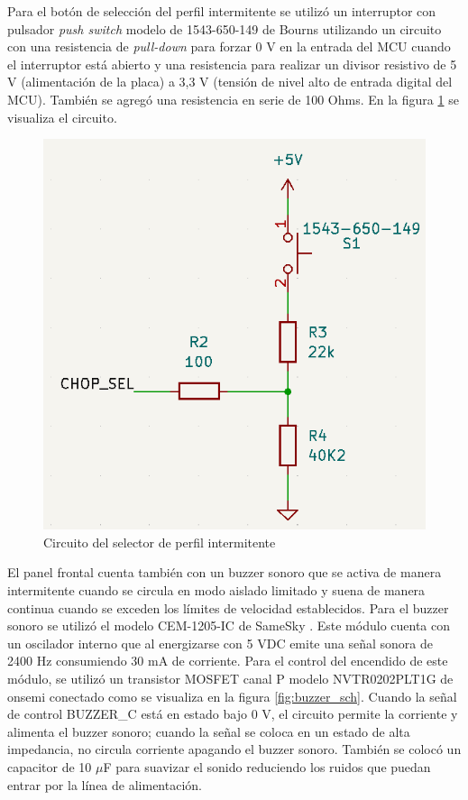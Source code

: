 Para el botón de selección del perfil intermitente se utilizó un interruptor con pulsador \textit{push switch} modelo de 1543-650-149 de Bourns \cite{1543-650-149} utilizando un circuito con una resistencia de \textit{pull-down} para forzar 0 V en la entrada del MCU cuando el interruptor está abierto y una resistencia para realizar un divisor resistivo de 5 V (alimentación de la placa) a 3,3 V (tensión de nivel alto de entrada digital del MCU). También se agregó una resistencia en serie de 100 Ohms. En la figura \ref{fig:chop_sel} se visualiza el circuito. 

\begin{figure}[H]
    \centering
    \includegraphics[width = 0.5 \linewidth]{img/chop_sel.png}
    \caption{Circuito del selector de perfil intermitente}
    \label{fig:chop_sel}
\end{figure}    


El panel frontal cuenta también con un buzzer sonoro que se activa de manera intermitente cuando se circula en modo aislado limitado y suena de manera continua cuando se exceden los límites de velocidad establecidos. Para el buzzer sonoro se utilizó el modelo CEM-1205-IC de SameSky \cite{CEM-1205-IC}. Este módulo cuenta con un oscilador interno que al energizarse con 5 VDC emite una señal sonora de 2400 Hz consumiendo 30 mA de corriente. Para el control del encendido de este módulo, se utilizó un transistor MOSFET canal P modelo NVTR0202PLT1G de onsemi \cite{NVTR0202PLT1G} conectado como se visualiza en la figura \ref{fig:buzzer_sch}. Cuando la señal de control BUZZER\_C está en estado bajo 0 V, el circuito permite la corriente y alimenta el buzzer sonoro; cuando la señal se coloca en un estado de alta impedancia, no circula corriente apagando el buzzer sonoro. También se colocó un capacitor de 10 $\mu$F para suavizar el sonido reduciendo los ruidos que puedan entrar por la línea de alimentación. 



